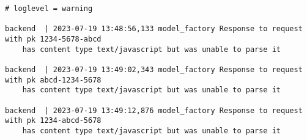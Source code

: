 \begin{minipage}{0.95\linewidth}
    \begin{lstlisting}[caption={Console log of an interaction with a web application on log level warning. Other logging levels include warnings, errors, and critical system failures.}, label={suppresslogscode}]
# loglevel = warning

backend  | 2023-07-19 13:48:56,133 model_factory Response to request with pk 1234-5678-abcd 
    has content type text/javascript but was unable to parse it

backend  | 2023-07-19 13:49:02,343 model_factory Response to request with pk abcd-1234-5678 
    has content type text/javascript but was unable to parse it

backend  | 2023-07-19 13:49:12,876 model_factory Response to request with pk 1234-abcd-5678 
    has content type text/javascript but was unable to parse it
    \end{lstlisting}
\end{minipage}